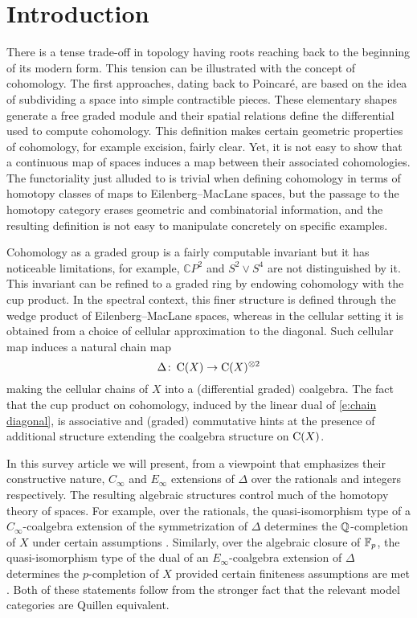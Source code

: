 
\section{Introduction} \label{s:introduction}

There is a tense trade-off in topology having roots reaching back to the beginning of its modern form.
This tension can be illustrated with the concept of cohomology.
The first approaches, dating back to Poincar\'e, are based on the idea of subdividing a space into simple contractible pieces.
These elementary shapes generate a free graded module and their spatial relations define the differential used to compute cohomology.
This definition makes certain geometric properties of cohomology, for example excision, fairly clear.
Yet, it is not easy to show that a continuous map of spaces induces a map between their associated cohomologies.
The functoriality just alluded to is trivial when defining cohomology in terms of homotopy classes of maps to Eilenberg--MacLane spaces, but the passage to the homotopy category erases geometric and combinatorial information, and the resulting definition is not easy to manipulate concretely on specific examples.

Cohomology as a graded group is a fairly computable invariant but it has noticeable limitations, for example, $\mathbb{C} P^2$ and $S^2 \vee S^4$ are not distinguished by it.
This invariant can be refined to a graded ring by endowing cohomology with the cup product.
In the spectral context, this finer structure is defined through the wedge product of Eilenberg--MacLane spaces, whereas in the cellular setting it is obtained from a choice of
cellular approximation to the diagonal.
Such cellular map induces a natural chain map
\begin{equation} \label{e:chain diagonal}
\Delta \colon \operatorname{C}(X) \to \operatorname{C}(X)^{\otimes 2}
\end{equation}
making the cellular chains of $X$ into a (differential graded) coalgebra.
The fact that the cup product on cohomology, induced by the linear dual of \eqref{e:chain diagonal}, is associative and (graded) commutative hints at the presence of additional structure extending the coalgebra structure on $\operatorname{C}(X)$.

In this survey article we will present, from a viewpoint that emphasizes their constructive nature, $C_\infty$ and $E_\infty$ extensions of $\Delta$ over the rationals and integers respectively.
The resulting algebraic structures control much of the homotopy theory of spaces.
For example, over the rationals, the quasi-isomorphism type of a $C_\infty$-coalgebra extension of the symmetrization of $\Delta$ determines the $\mathbb{Q}$-completion of $X$ under certain assumptions \cite{quillen1969rational, buijs2020liemodels}.
Similarly, over the algebraic closure of ${\mathbb{F}_p}$, the quasi-isomorphism type of the dual of an $E_\infty$-coalgebra extension of $\Delta$ determines the $p$-completion of $X$ provided certain finiteness assumptions are met \cite{mandell2001padic}.
Both of these statements follow from the stronger fact that the relevant model categories are Quillen equivalent.

